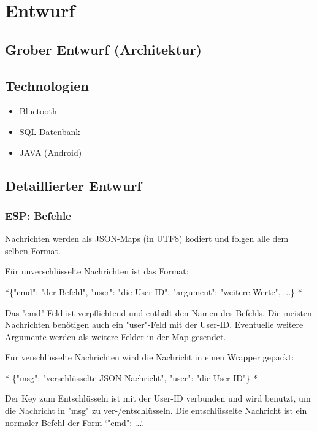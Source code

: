 
\newpage

\chapter{Entwurf} %
\label{cha:entwurf}

\section{Grober Entwurf (Architektur)}
\label{sec:groberentwurf}

\section{Technologien}
\label{sec:technologien}

	\begin{itemize}	
		\item Bluetooth
		\item SQL Datenbank
		\item JAVA (Android)
	\end{itemize}
\section{Detaillierter Entwurf}
\label{sec:detaillierterentwurf}

\subsection{ESP: Befehle}
\label{sec:espbefehle}

Nachrichten werden als JSON-Maps (in UTF8) kodiert und folgen alle dem selben Format.

Für unverschlüsselte Nachrichten ist das Format:

*\{"cmd": "der Befehl", "user": "die User-ID", "argument": "weitere Werte", ...\}
*

Das "cmd"-Feld ist verpflichtend und enthält den Namen des Befehls. Die meisten Nachrichten benötigen auch ein "user"-Feld mit der User-ID. Eventuelle weitere Argumente werden als weitere Felder in der Map gesendet.

Für verschlüsselte Nachrichten wird die Nachricht in einen Wrapper gepackt:

*
\{"msg": "verschlüsselte JSON-Nachricht", "user": "die User-ID"\}
*

Der Key zum Entschlüsseln ist mit der User-ID verbunden und wird benutzt, um die Nachricht in "msg" zu ver-/entschlüsseln. Die entschlüsselte Nachricht ist ein normaler Befehl der Form `{"cmd": ...}`.

